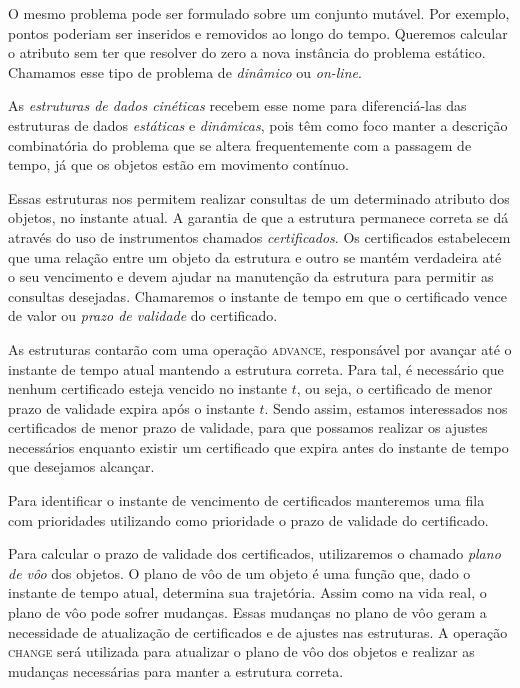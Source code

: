 O mesmo problema pode ser formulado sobre um conjunto mutável. Por exemplo,
pontos poderiam ser inseridos e removidos ao longo do tempo. Queremos calcular o
atributo sem ter que resolver do zero a nova instância do problema estático.
Chamamos esse tipo de problema de \textit{dinâmico} ou \textit{on-line}.

As \emph{estruturas de dados cinéticas} recebem esse nome para diferenciá-las
das estruturas de dados \textit{estáticas} e \textit{dinâmicas}, pois têm como
foco manter a descrição combinatória do problema que se altera frequentemente
com a passagem de tempo, já que os objetos estão em movimento contínuo.

Essas estruturas nos permitem realizar consultas de um determinado atributo dos
objetos, no instante atual. A garantia de que a estrutura permanece correta se
dá através do uso de instrumentos chamados \textit{certificados}. Os
certificados estabelecem que uma relação entre um objeto da estrutura e outro se
mantém verdadeira até o seu vencimento e devem ajudar na manutenção da estrutura
para permitir as consultas desejadas. Chamaremos o instante de tempo em que o
certificado vence de valor ou \textit{prazo de validade} do certificado.

As estruturas contarão com uma operação \textsc{advance}, responsável por
avançar até o instante de tempo atual mantendo a estrutura correta. Para tal, é
necessário que nenhum certificado esteja vencido no instante $t$, ou seja, o
certificado de menor prazo de validade expira após o instante $t$. Sendo assim,
estamos interessados nos certificados de menor prazo de validade, para que
possamos realizar os ajustes necessários enquanto existir um certificado que
expira antes do instante de tempo que desejamos alcançar.

Para identificar o instante de vencimento de certificados manteremos uma fila
com prioridades utilizando como prioridade o prazo de validade do certificado.

Para calcular o prazo de validade dos certificados, utilizaremos o chamado
\textit{plano de vôo} dos objetos. O plano de vôo de um objeto é uma função que,
dado o instante de tempo atual, determina sua trajetória. Assim como na vida
real, o plano de vôo pode sofrer mudanças. Essas mudanças no plano de vôo geram
a necessidade de atualização de certificados e de ajustes nas estruturas. A
operação \textsc{change} será utilizada para atualizar o plano de vôo dos
objetos e realizar as mudanças necessárias para manter a estrutura correta.

